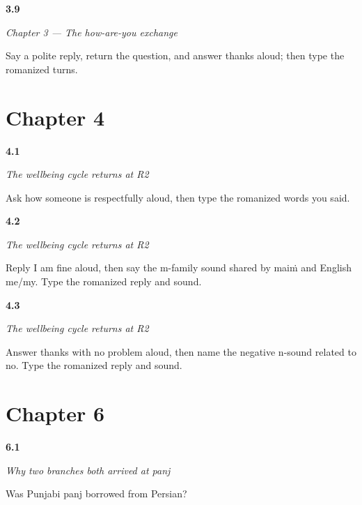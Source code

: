 \noindent\begin{minipage}[t]{\linewidth}
\raggedright
\hypertarget{review-PA-C03-practice-speaking}{\textbf{3.9}} \emph{Chapter 3 — The how-are-you exchange}\par
\small Say a polite reply, return the question, and answer thanks aloud; then type the romanized turns.
\end{minipage}\par\medskip

\section*{Chapter 4}

\noindent\begin{minipage}[t]{\linewidth}
\raggedright
\hypertarget{review-PA-R04-wellbeing-r2-question}{\textbf{4.1}} \emph{The wellbeing cycle returns at R2}\par
\small Ask how someone is respectfully aloud, then type the romanized words you said.
\end{minipage}\par\medskip

\noindent\begin{minipage}[t]{\linewidth}
\raggedright
\hypertarget{review-PA-R04-wellbeing-r2-reply}{\textbf{4.2}} \emph{The wellbeing cycle returns at R2}\par
\small Reply I am fine aloud, then say the m-family sound shared by maiṁ and English me/my. Type the romanized reply and sound.
\end{minipage}\par\medskip

\noindent\begin{minipage}[t]{\linewidth}
\raggedright
\hypertarget{review-PA-R04-wellbeing-r2-close}{\textbf{4.3}} \emph{The wellbeing cycle returns at R2}\par
\small Answer thanks with no problem aloud, then name the negative n-sound related to no. Type the romanized reply and sound.
\end{minipage}\par\medskip

\section*{Chapter 6}

\noindent\begin{minipage}[t]{\linewidth}
\raggedright
\hypertarget{review-PA-C06-panj-convergence-borrowing}{\textbf{6.1}} \emph{Why two branches both arrived at \emph{panj}}\par
\small Was Punjabi panj borrowed from Persian?
\end{minipage}\par\medskip

